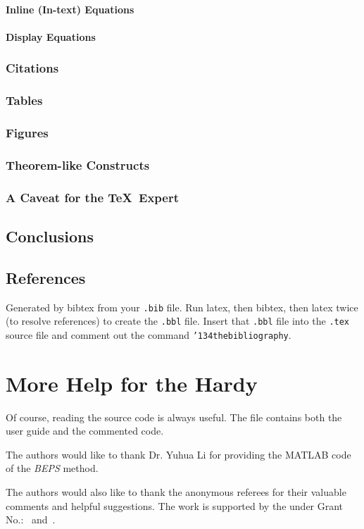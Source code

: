 \paragraph{Inline (In-text) Equations}
\paragraph{Display Equations}
\subsubsection{Citations}
\subsubsection{Tables}
\subsubsection{Figures}
\subsubsection{Theorem-like Constructs}
\subsubsection*{A Caveat for the \TeX\ Expert}
\subsection{Conclusions}
\subsection{References}
Generated by bibtex from your \texttt{.bib} file.  Run latex,
then bibtex, then latex twice (to resolve references)
to create the \texttt{.bbl} file.  Insert that \texttt{.bbl}
file into the \texttt{.tex} source file and comment out
the command \texttt{{\char'134}thebibliography}.
\section{More Help for the Hardy}

Of course, reading the source code is always useful.  The file
 contains both the user guide and the commented
code.

\begin{acks}
  The authors would like to thank Dr. Yuhua Li for providing the
  MATLAB code of the \textit{BEPS} method.

  The authors would also like to thank the anonymous referees for
  their valuable comments and helpful suggestions. The work is
  supported by the  under Grant
  No.:~
  and~.

\end{acks}
